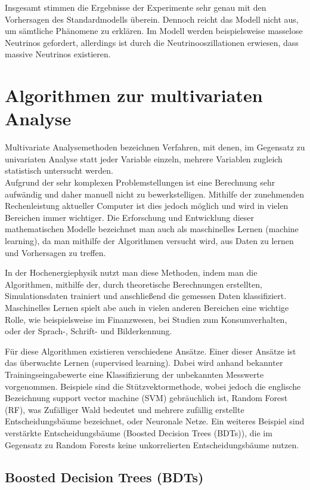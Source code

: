 Insgesamt stimmen die Ergebnisse der Experimente sehr genau mit den Vorhersagen des Standardmodells \"uberein. Dennoch reicht das Modell nicht aus, um s\"amtliche Ph\"anomene zu erkl\"aren. Im Modell werden beispielsweise masselose Neutrinos gefordert, allerdings ist durch die Neutrinooszillationen erwiesen, dass massive Neutrinos existieren.


\section{Algorithmen zur multivariaten Analyse}
\label{ch:Theorie:sec:Algorithmen}

Multivariate Analysemethoden bezeichnen Verfahren, mit denen, im Gegensatz zu univariaten Analyse statt jeder Variable einzeln, mehrere Variablen zugleich statistisch untersucht werden.\\
Aufgrund der sehr komplexen Problemstellungen ist eine Berechnung sehr aufw\"andig und daher manuell nicht zu bewerkstelligen. Mithilfe der zunehmenden Rechenleistung aktueller Computer ist dies jedoch m\"oglich und wird in vielen Bereichen immer wichtiger. Die Erforschung und Entwicklung dieser mathematischen Modelle bezeichnet man auch als maschinelles Lernen (machine learning), da man mithilfe der Algorithmen versucht wird, aus Daten zu lernen und Vorhersagen zu treffen. \cite{SWB-455193959}

In der Hochenergiephysik nutzt man diese Methoden, indem man die Algorithmen, mithilfe der, durch theoretische Berechnungen erstellten, Simulationsdaten trainiert und anschlie\ss end die gemessen Daten klassifiziert.\\ 
Maschinelles Lernen spielt abe auch in vielen anderen Bereichen eine wichtige Rolle, wie beispielsweise im Finanzwesen, bei Studien zum Konsumverhalten, oder der Sprach-, Schrift- und Bilderkennung.

F\"ur diese Algorithmen existieren verschiedene Ans\"atze. Einer dieser Ans\"atze ist das \"uberwachte Lernen (supervised learning). Dabei wird anhand bekannter Trainingseingabewerte eine Klassifizierung der unbekannten Messwerte vorgenommen. Beispiele sind die St\"utzvektormethode, wobei jedoch die englische Bezeichnung support vector machine (SVM) gebr\"auchlich ist, Random Forest (RF), was Zuf\"alliger Wald bedeutet und mehrere zuf\"allig erstellte Entscheidungsb\"aume bezeichnet, oder Neuronale Netze. Ein weiteres Beispiel sind verst\"arkte Entscheidungsb\"aume (Boosted Decision Trees (BDTs)), die im Gegensatz zu Random Forests keine unkorrelierten Entscheidungsb\"aume nutzen.



\subsection{Boosted Decision Trees (BDTs)}
\label{ch:Algorithmen:subsec:BDT}
